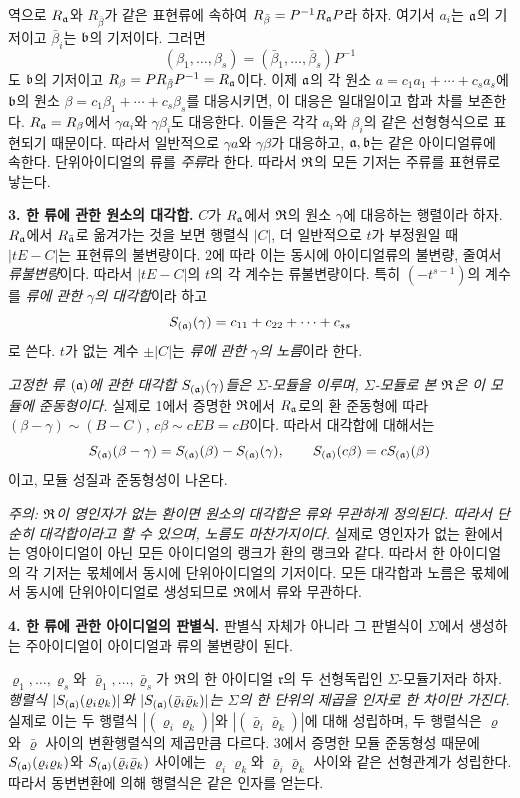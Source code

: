 역으로 \(R_{\mathfrak{a}}\)와 \(R_{\bar\beta}\)가 같은 표현류에 속하여 \(R_{\bar\beta}=P^{-1}R_{\mathfrak{a}} P\)라 하자. 여기서 \(a_i\)는 \(\mathfrak{a}\)의 기저이고 \(\bar\beta_i\)는 \(\mathfrak{b}\)의 기저이다. 그러면
\[
(\beta_1,\ldots,\beta_s)=(\bar\beta_1,\ldots,\bar\beta_s)P^{-1}
\]
도 \(\mathfrak{b}\)의 기저이고 \(R_\beta=PR_{\bar\beta}P^{-1}=R_{\mathfrak{a}}\)이다. 이제 \(\mathfrak{a}\)의 각 원소 \(a=c_1a_1+\cdots+c_sa_s\)에 \(\mathfrak{b}\)의 원소 \(\beta=c_1\beta_1+\cdots+c_s\beta_s\)를 대응시키면, 이 대응은 일대일이고 합과 차를 보존한다. \(R_{\mathfrak{a}}=R_\beta\)에서 \(\gamma a_i\)와 \(\gamma\beta_i\)도 대응한다. 이들은 각각 \(a_i\)와 \(\beta_i\)의 같은 선형형식으로 표현되기 때문이다. 따라서 일반적으로 \(\gamma a\)와 \(\gamma\beta\)가 대응하고, \(\mathfrak{a},\mathfrak{b}\)는 같은 아이디얼류에 속한다. 단위아이디얼의 류를 \emph{주류}라 한다. 따라서 \(\mathfrak{R}\)의 모든 기저는 주류를 표현류로 낳는다.

\textbf{3. 한 류에 관한 원소의 대각합.} \(C\)가 \(R_{\mathfrak{a}}\)에서 \(\mathfrak{R}\)의 원소 \(\gamma\)에 대응하는 행렬이라 하자. \(R_{\mathfrak{a}}\)에서 \(R_{\bar{\mathfrak{a}}}\)로 옮겨가는 것을 보면 행렬식 \(|C|\), 더 일반적으로 \(t\)가 부정원일 때 \(|tE-C|\)는 표현류의 불변량이다. 2에 따라 이는 동시에 아이디얼류의 불변량, 줄여서 \emph{류불변량}이다. 따라서 \(|tE-C|\)의 \(t\)의 각 계수는 류불변량이다. 특히 \((-t^{s-1})\)의 계수를 \emph{류에 관한 \(\gamma\)의 대각합}이라 하고
\[
S_{(\mathfrak{a})}(\gamma)=c_{11}+c_{22}+\cdots+c_{ss}
\]
로 쓴다. \(t\)가 없는 계수 \(\pm|C|\)는 \emph{류에 관한 \(\gamma\)의 노름}이라 한다.

\emph{고정한 류 \((\mathfrak{a})\)에 관한 대각합 \(S_{(\mathfrak{a})}(\gamma)\)들은 \(\Sigma\)-모듈을 이루며, \(\Sigma\)-모듈로 본 \(\mathfrak{R}\)은 이 모듈에 준동형이다.} 실제로 1에서 증명한 \(\mathfrak{R}\)에서 \(R_{\mathfrak{a}}\)로의 환 준동형에 따라 \((\beta-\gamma)\sim(B-C)\), \(c\beta\sim cEB=cB\)이다. 따라서 대각합에 대해서는
\[
S_{(\mathfrak{a})}(\beta-\gamma)=S_{(\mathfrak{a})}(\beta)-S_{(\mathfrak{a})}(\gamma),
\qquad S_{(\mathfrak{a})}(c\beta)=cS_{(\mathfrak{a})}(\beta)
\]
이고, 모듈 성질과 준동형성이 나온다.

\emph{주의: \(\mathfrak{R}\)이 영인자가 없는 환이면 원소의 대각합은 류와 무관하게 정의된다. 따라서 단순히 대각합이라고 할 수 있으며, 노름도 마찬가지이다.} 실제로 영인자가 없는 환에서는 영아이디얼이 아닌 모든 아이디얼의 랭크가 환의 랭크와 같다. 따라서 한 아이디얼의 각 기저는 몫체에서 동시에 단위아이디얼의 기저이다. 모든 대각합과 노름은 몫체에서 동시에 단위아이디얼로 생성되므로 \(\mathfrak{R}\)에서 류와 무관하다.

\textbf{4. 한 류에 관한 아이디얼의 판별식.} 판별식 자체가 아니라 그 판별식이 \(\Sigma\)에서 생성하는 주아이디얼이 아이디얼과 류의 불변량이 된다.

\(\varrho_1,\ldots,\varrho_s\)와 \(\bar\varrho_1,\ldots,\bar\varrho_s\)가 \(\mathfrak{R}\)의 한 아이디얼 \(\mathfrak r\)의 두 선형독립인 \(\Sigma\)-모듈기저라 하자. \emph{행렬식 \(|S_{(\mathfrak{a})}(\varrho_i\varrho_k)|\)와 \(|S_{(\mathfrak{a})}(\bar\varrho_i\bar\varrho_k)|\)는 \(\Sigma\)의 한 단위의 제곱을 인자로 한 차이만 가진다.} 실제로 이는 두 행렬식 \(|(\varrho_i\varrho_k)|\)와 \(|(\bar\varrho_i\bar\varrho_k)|\)에 대해 성립하며, 두 행렬식은 \(\varrho\)와 \(\bar\varrho\) 사이의 변환행렬식의 제곱만큼 다르다. 3에서 증명한 모듈 준동형성 때문에 \(S_{(\mathfrak{a})}(\varrho_i\varrho_k)\)와 \(S_{(\mathfrak{a})}(\bar\varrho_i\bar\varrho_k)\) 사이에는 \(\varrho_i\varrho_k\)와 \(\bar\varrho_i\bar\varrho_k\) 사이와 같은 선형관계가 성립한다. 따라서 동변변환에 의해 행렬식은 같은 인자를 얻는다.

